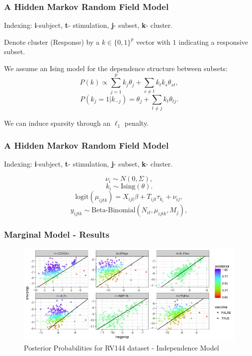 \documentclass{beamer}
\theoremstyle{definition}
\begin{document}

\begin{frame}
\frametitle{A Hidden Markov Random Field Model}
\begin{framed}
Indexing: \textbf{i}-subject, \textbf{t}- stimulation, \textbf{j}- subset, \textbf{k}- cluster.
\end{framed}

Denote cluster (Response) by a $k \in \{0,1\}^{p}$ vector with $1$ indicating a responsive subset.
\pause
\vspace{0.3 cm}

We assume an Ising model for the dependence structure between subsets:
$$
P(k) \propto \sum_{j=1}^{p} k_{j} \theta_j + \sum_{s\neq t} k_{t} k_{s} \theta_{st},
$$$$
P(k_{j} = 1| k_{-j}) = \theta_{j} + \sum_{t\neq j } k_{t} \theta_{tj}.
$$

\pause
\vspace{0.3 cm}
We can induce sparsity through an $\ell_1$ penalty.

\end{frame}


\begin{frame}
\frametitle{A Hidden Markov Random Field Model}
\begin{framed}
Indexing: \textbf{i}-subject, \textbf{t}- stimulation, \textbf{j}- subset, \textbf{k}- cluster.
\end{framed}

$$
\nu_i \sim N(0, \Sigma),
$$$$
k_i \sim \text{Ising}(\theta).
$$$$
\text{logit}(\mu_{ijtk}) = X_{ijt} \beta + T_{ijt}\tau_{k_i} + \nu_{ij} ,
$$$$
y_{ijtk} \sim \text{Beta-Binomial}(N_{it}, \mu_{ijtk}, M_j) ,
$$
\end{frame}


\begin{frame}
\frametitle{Marginal Model - Results}
\begin{center}
\begin{figure}[]
\includegraphics[width=12 cm]{figures/marginalBooleansIndependenceScatter}
 \caption{Posterior Probabilities for RV144 dataset - Independence Model}
\end{figure}
\end{center}
\end{frame}
\end{document}
